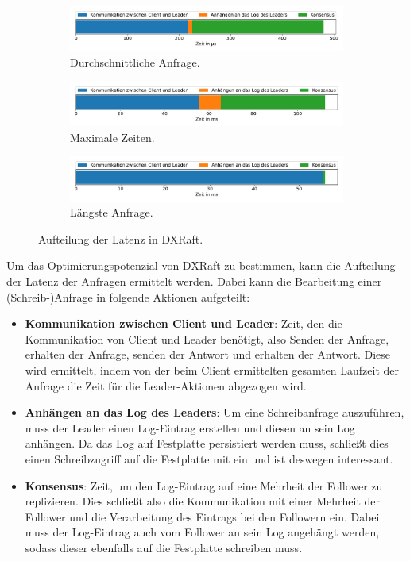 \begin{figure}[t]
	\centering
	\begin{subfigure}[t]{1\textwidth}
		\includegraphics[width=\textwidth]{img/request_avg_timing.pdf}
		\caption{Durchschnittliche Anfrage.}
		\label{fig:request-avg}
	\end{subfigure}
	\begin{subfigure}[t]{1\textwidth}
		\includegraphics[width=\textwidth]{img/request_max_timing.pdf}
		\caption{Maximale Zeiten.}
		\label{fig:request-max}
	\end{subfigure}
	\begin{subfigure}[t]{1\textwidth}
		\includegraphics[width=\textwidth]{img/request_longest_timing.pdf}
		\caption{Längste Anfrage.}
		\label{fig:request-longest}
	\end{subfigure}
	\caption{Aufteilung der Latenz in DXRaft.}
	\label{fig:latency-analysis}
\end{figure}

Um das Optimierungspotenzial von DXRaft zu bestimmen, kann die Aufteilung der Latenz der Anfragen ermittelt werden. Dabei kann die Bearbeitung einer (Schreib-)Anfrage in folgende Aktionen aufgeteilt:
\begin{itemize}
	\item \textbf{Kommunikation zwischen Client und Leader}: Zeit, den die Kommunikation von Client und Leader benötigt, also Senden der Anfrage, erhalten der Anfrage, senden der Antwort und erhalten der Antwort. Diese wird ermittelt, indem von der beim Client ermittelten gesamten Laufzeit der Anfrage die Zeit für die Leader-Aktionen abgezogen wird.
	\item \textbf{Anhängen an das Log des Leaders}: Um eine Schreibanfrage auszuführen, muss der Leader einen Log-Eintrag erstellen und diesen an sein Log anhängen. Da das Log auf Festplatte persistiert werden muss, schließt dies einen Schreibzugriff auf die Festplatte mit ein und ist deswegen interessant.
	\item \textbf{Konsensus}: Zeit, um den Log-Eintrag auf eine Mehrheit der Follower zu replizieren. Dies schließt also die Kommunikation mit einer Mehrheit der Follower und die Verarbeitung des Eintrags bei den Followern ein. Dabei muss der Log-Eintrag auch vom Follower an sein Log angehängt werden, sodass dieser ebenfalls auf die Festplatte schreiben muss.
\end{itemize}


